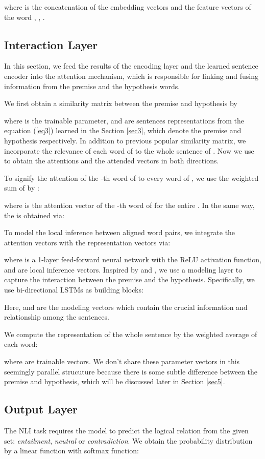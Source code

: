 \documentclass[11pt,letterpaper]{article}
\begin{document}
where   is the concatenation of the embedding vectors and the feature vectors of the word , , .

\subsection{Interaction Layer}
In this section, we feed the results of the encoding layer and the learned sentence encoder into the attention mechanism, which is responsible for linking and fusing information from the premise and the hypothesis words. 

We first obtain a similarity matrix  between the premise and hypothesis by 

where  is the trainable parameter,  and  are sentences representations from the equation (\ref{eq3}) learned in the Section \ref{sec3}, which denote the premise and hypothesis respectively. In addition to previous popular similarity matrix, we incorporate the relevance of each word of  to the whole sentence of . Now we use  to obtain the attentions and the attended vectors in both directions.

To signify the attention of the -th word of  to every word of , we use the weighted sum of  by :

where  is the attention vector of the -th word of  for the entire . In the same way, the  is obtained via:


To model the local inference between aligned word pairs, we integrate the attention vectors with the representation vectors via:

where  is a 1-layer feed-forward neural network with the ReLU activation function,  and  are local inference vectors. Inspired by \cite{seo2016bidirectional} and \cite{chen2017natural}, we use a modeling layer to capture the interaction between the premise and the hypothesis. Specifically, we use bi-directional LSTMs as building blocks:

Here,  and  are the modeling vectors which contain the crucial information and relationship among the sentences.


We compute the representation of the whole sentence by the weighted average of each word:

where  are trainable vectors. We don't share these parameter vectors in this seemingly parallel strucuture because there is some subtle difference between the premise and hypothesis, which will be discussed later in Section \ref{sec5}.

\subsection{Output Layer}
The NLI task requires the model to predict the logical relation from the given set: \emph{entailment}, \emph{neutral} or \emph{contradiction}. We obtain the probability distribution by a linear function with softmax function:
\end{document}
